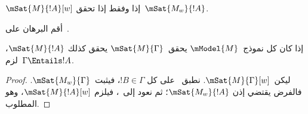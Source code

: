 \documentclass[../../../include/open-logic-section]{subfiles}
\begin{document}
\begin{prop}
  $\mSat{M}{!A}[w]$ إذا وفقط إذا تحقق~$\mSat{M_w}{!A}$.
\end{prop}

\begin{prob}
  أقم البرهان على~.
\end{prob}

\begin{prop}
  إذا كان كل نموذج~$\mModel{M}$ يحقق~$\mSat{M}{\Gamma}$ يحقق كذلك
  $\mSat{M}{!A}$، لزم~$\Gamma \Entails !A$.
\end{prop}

\begin{proof}
  ليكن~$\mSat{M}{\Gamma}[w]$. نطبق~ على كل
  $!B \in \Gamma$، فيثبت~$\mSat{M_w}{\Gamma}$. فالفرض يقتضي إذن
  $\mSat{M_w}{!A}$؛ ثم نعود إلى~، فيلزم
  $\mSat{M}{!A}[w]$، وهو المطلوب.
\end{proof}
\end{document}
